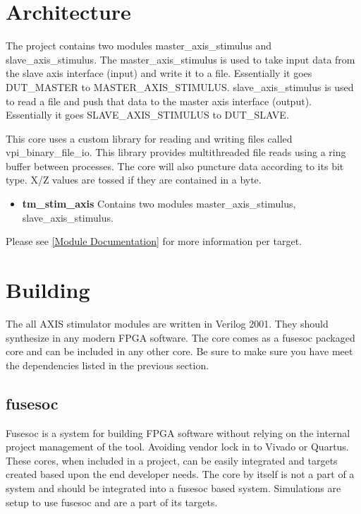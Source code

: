 

\section{Architecture}
\par
The project contains two modules master\_axis\_stimulus and slave\_axis\_stimulus. The master\_axis\_stimulus is used to take
input data from the slave axis interface (input) and write it to a file. Essentially it goes DUT\_MASTER to MASTER\_AXIS\_STIMULUS.
slave\_axis\_stimulus is used to read a file and push that data to the master axis interface (output). Essentially it goes
SLAVE\_AXIS\_STIMULUS to DUT\_SLAVE.
\par
This core uses a custom library for reading and writing files called vpi\_binary\_file\_io. This library provides multithreaded file reads
using a ring buffer between processes. The core will also puncture data according to its bit type. X/Z values are tossed if they are contained
in a byte.

\begin{itemize}
  \item \textbf{tm\_stim\_axis} Contains two modules master\_axis\_stimulus, slave\_axis\_stimulus.
\end{itemize}

Please see \ref{Module Documentation} for more information per target.

\section{Building}

\par
The all AXIS stimulator modules are written in Verilog 2001. They should synthesize in any modern FPGA software. The core comes as a fusesoc packaged core and can be
included in any other core. Be sure to make sure you have meet the dependencies listed in the previous section.

\subsection{fusesoc}
\par
Fusesoc is a system for building FPGA software without relying on the internal project management of the tool. Avoiding vendor lock in to Vivado or Quartus.
These cores, when included in a project, can be easily integrated and targets created based upon the end developer needs. The core by itself is not a part of
a system and should be integrated into a fusesoc based system. Simulations are setup to use fusesoc and are a part of its targets.

